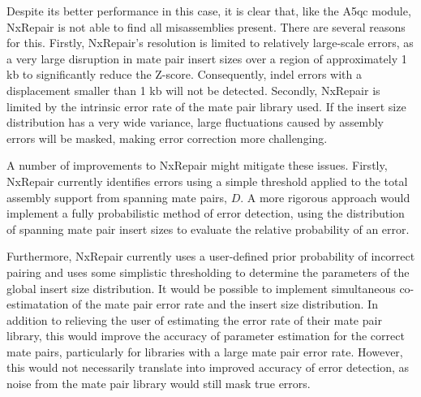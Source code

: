 \documentclass[fleqn,10pt]{wlpeerj}
\begin{document}
Despite its better performance in this case, it is clear that, like the A5qc module, NxRepair is not able to find all misassemblies present. There are several reasons for this. Firstly, NxRepair's resolution is limited to relatively large-scale errors, as a very large disruption in mate pair insert sizes over a region of approximately 1 kb to significantly reduce the Z-score. Consequently, indel errors with a displacement smaller than 1 kb will not be detected. Secondly, NxRepair is limited by the intrinsic error rate of the mate pair library used. If the insert size distribution has a very wide variance, large fluctuations caused by assembly errors will be masked, making error correction more challenging. 

A number of improvements to NxRepair might mitigate these issues. Firstly, NxRepair currently identifies errors using a simple threshold applied to the total assembly support from spanning mate pairs, $D$. A more rigorous approach would implement a fully probabilistic method of error detection, using the distribution of spanning mate pair insert sizes to evaluate the relative probability of an error. 

Furthermore, NxRepair currently uses a user-defined prior probability of incorrect pairing and uses some simplistic thresholding to determine the parameters of the global insert size distribution. It would be possible to implement simultaneous co-estimatation of the mate pair error rate and the insert size distribution. In addition to relieving the user of estimating the error rate of their mate pair library, this would improve the accuracy of parameter estimation for the correct mate pairs, particularly for libraries with a large mate pair error rate. However, this would not necessarily translate into improved accuracy of error detection, as noise from the mate pair library would still mask true errors.        
\end{document}
